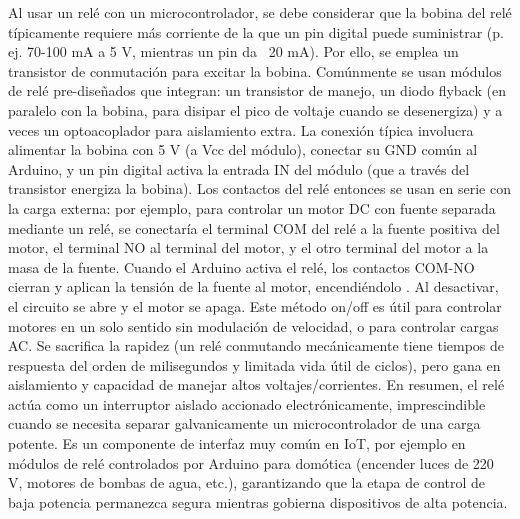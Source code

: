 Al usar un relé con un microcontrolador, se debe considerar que la bobina del relé típicamente requiere más corriente de la que un pin digital puede suministrar (p. ej. 70-100 mA a 5 V, mientras un pin da ~20 mA). Por ello, se emplea un transistor de conmutación para excitar la bobina. Comúnmente se usan módulos de relé pre-diseñados que integran: un transistor de manejo, un diodo flyback (en paralelo con la bobina, para disipar el pico de voltaje cuando se desenergiza) y a veces un optoacoplador para aislamiento extra. La conexión típica involucra alimentar la bobina con 5 V (a Vcc del módulo), conectar su GND común al Arduino, y un pin digital activa la entrada IN del módulo (que a través del transistor energiza la bobina). Los contactos del relé entonces se usan en serie con la carga externa: por ejemplo, para controlar un motor DC con fuente separada mediante un relé, se conectaría el terminal COM del relé a la fuente positiva del motor, el terminal NO al terminal del motor, y el otro terminal del motor a la masa de la fuente. Cuando el Arduino activa el relé, los contactos COM-NO cierran y aplican la tensión de la fuente al motor, encendiéndolo \cite{Actuadores-2}. Al desactivar, el circuito se abre y el motor se apaga. Este método on/off es útil para controlar motores en un solo sentido sin modulación de velocidad, o para controlar cargas AC. Se sacrifica la rapidez (un relé conmutando mecánicamente tiene tiempos de respuesta del orden de milisegundos y limitada vida útil de ciclos), pero gana en aislamiento y capacidad de manejar altos voltajes/corrientes. En resumen, el relé actúa como un interruptor aislado accionado electrónicamente, imprescindible cuando se necesita separar galvanicamente un microcontrolador de una carga potente. Es un componente de interfaz muy común en IoT, por ejemplo en módulos de relé controlados por Arduino para domótica (encender luces de 220 V, motores de bombas de agua, etc.), garantizando que la etapa de control de baja potencia permanezca segura mientras gobierna dispositivos de alta potencia.

